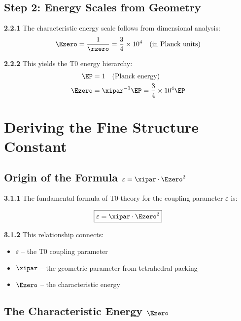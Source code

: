 	\subsection{Step 2: Energy Scales from Geometry}
	
	\noindent \textbf{2.2.1} The characteristic energy scale follows from dimensional analysis:
	\begin{equation}
		\Ezero = \frac{1}{\rzero} = \frac{3}{4} \times 10^{4} \quad \text{(in Planck units)}
	\end{equation}
	
	\noindent \textbf{2.2.2} This yields the T0 energy hierarchy:
	\begin{align}
		\EP &= 1 \quad \text{(Planck energy)} \\
		\Ezero &= \xipar^{-1} \EP = \frac{3}{4} \times 10^{4} \EP
	\end{align}
	
	\section{Deriving the Fine Structure Constant}
	
	\subsection{Origin of the Formula $\varepsilon = \xipar \cdot \Ezero^2$}
	
	\noindent \textbf{3.1.1} The fundamental formula of T0-theory for the coupling parameter $\varepsilon$ is:
	\begin{keyresult}
		\begin{equation}
			\boxed{\varepsilon = \xipar \cdot \Ezero^2}
			\label{eq:epsilon_definition}
		\end{equation}
	\end{keyresult}
	
	\noindent \textbf{3.1.2} This relationship connects:
	\begin{itemize}
		\item $\varepsilon$ -- the T0 coupling parameter
		\item $\xipar$ -- the geometric parameter from tetrahedral packing
		\item $\Ezero$ -- the characteristic energy
	\end{itemize}
	
	\subsection{The Characteristic Energy $\Ezero$}
	

